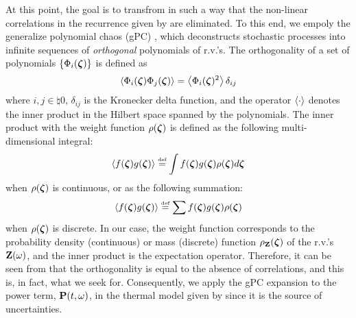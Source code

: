 At this point, the goal is to transfrom  in such a way that the non-linear correlations in the recurrence given by  are eliminated. To this end, we empoly the generalize polynomial chaos (gPC) \cite{xiu2002}, which deconstructs stochastic processes into infinite sequences of \emph{orthogonal} polynomials of r.v.'s. The orthogonality of a set of polynomials $\{ \Phi_i(\boldsymbol{\zeta}) \}$ is defined as
\begin{equation} \elabel{orthogonality}
  \oInner{\pcb_i(\virv) \pcb_j(\virv)} = \oInner{\pcb_i(\virv)^2} \delta_{ij}
\end{equation}
where $i,j \in \natural{0}$, $\delta_{ij}$ is the Kronecker delta function, and the operator $\left\langle \cdot \right\rangle$ denotes the inner product in the Hilbert space spanned by the polynomials. The inner product with the weight function $\rho(\boldsymbol{\zeta})$ is defined as the following multi-dimensional integral:
\begin{equation} \elabel{inner-product-integral}
  \oInner{f(\virv) g(\virv)} \eqdef \int f(\virv) g(\virv) \pdf(\virv) d\virv
\end{equation}
when $\rho(\boldsymbol{\zeta})$ is continuous, or as the following summation:
\begin{equation} \elabel{inner-product-sum}
  \oInner{f(\virv) g(\virv)} \eqdef \sum f(\virv) g(\virv) \pdf(\virv)
\end{equation}
when $\rho(\boldsymbol{\zeta})$ is discrete. In our case, the weight function corresponds to the probability density (continuous) or mass (discrete) function $\rho_{\mathbf{Z}}(\boldsymbol{\zeta})$ of the r.v.'s $\mathbf{Z}(\omega)$, and the inner product is the expectation operator. Therefore, it can be seen from  that the orthogonality is equal to the absence of correlations, and this is, in fact, what we seek for. Consequently, we apply the gPC expansion to the power term, $\mathbf{P}(t, \omega)$, in the thermal model given by  since it is the source of uncertainties.

